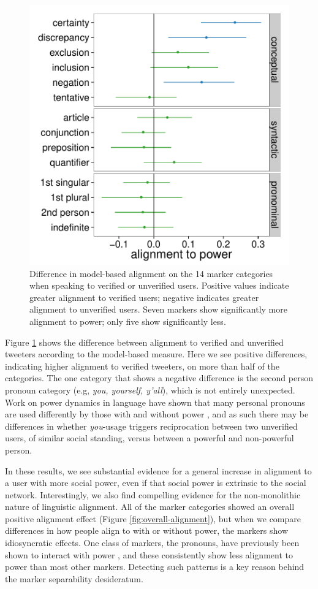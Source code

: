 \documentclass{acm_proc_article-sp}
\begin{document}
\begin{figure}[t]
\centering
\includegraphics[width=.9\columnwidth]{graphics/www2016_ourpowerdiff_verif_final95.pdf}
\caption{Difference in model-based alignment on the 14 marker categories when speaking to verified or unverified users. Positive values indicate greater alignment to verified users; negative indicates greater alignment to unverified users. Seven markers show significantly more alignment to power; only five show significantly less.}\label{fig:our-verified}
\end{figure}

Figure \ref{fig:our-verified} shows the difference between alignment to verified and unverified tweeters according to the model-based measure. Here we see positive differences, indicating higher alignment to verified tweeters, on more than half of the categories.  The one category that shows a negative difference is the second person pronoun category (e.g, \textit{you, yourself, y'all}), which is not entirely unexpected. Work on power dynamics in language have shown that many personal pronouns are used differently by those with and without power \cite{KacewiczEtAl2013,ChungPennebaker2007}, and as such there may be differences in whether \textit{you}-usage triggers reciprocation between two unverified users, of similar social standing, versus between a powerful and non-powerful person.

In these results, we see substantial evidence for a general increase in alignment to a user with more social power, even if that social power is extrinsic to the social network.  Interestingly, we also find compelling evidence for the non-monolithic nature of linguistic alignment. All of the marker categories showed an overall positive alignment effect (Figure \ref{fig:overall-alignment}), but when we compare differences in how people align to with or without power, the markers show idiosyncratic effects.  One class of markers, the pronouns, have previously been shown to interact with power \cite{KacewiczEtAl2013}, and these consistently show less alignment to power than most other markers. Detecting such patterns is a key reason behind the marker separability desideratum.
\end{document}
